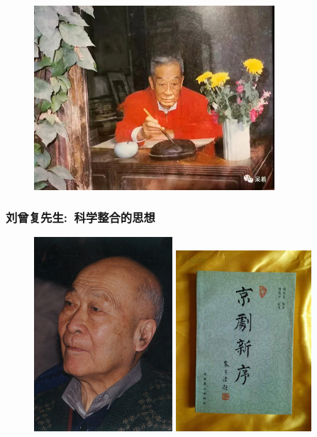 \documentclass[cjk,slidestop,compress,mathserif,blue]{beamer}
\begin{document}
\frame
{
	\frametitle{}
\begin{figure}[h!]
\centering
\vspace{-0.15in}
\includegraphics[height=0.65\textwidth,width=0.80\textwidth,clip]{Figures_Peking-Opera/PekOpe_Zhu.jpg}
\label{Zhu_Jiajin-2}
\end{figure}
}

\frame
{
	\frametitle{刘曾复先生:~科学整合的思想}
\begin{figure}[h!]
\centering
\vspace{-0.2in}
\includegraphics[height=0.64\textwidth,width=0.46\textwidth,viewport=0 0 360 520,clip]{Figures_Peking-Opera/Liu_Zengfu.jpg}
\hskip 5pt
\includegraphics[height=0.62\textwidth,width=0.45\textwidth,viewport=100 85 660 875,clip]{Figures_Peking-Opera/Liu_Xinxu.jpg}
\label{Liu_Zengfu}
\end{figure}
}
\end{document}
